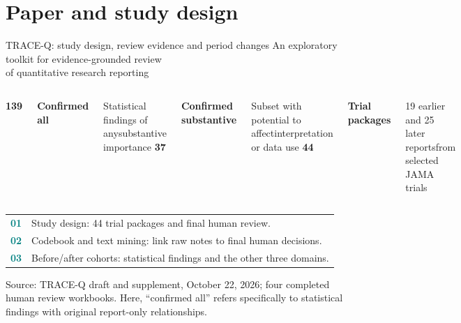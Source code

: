 \documentclass[10pt,aspectratio=169]{beamer}
\newcommand{\src}[1]{\par\vfill{\color{Slate}\fontsize{6.5}{8}\selectfont #1\par}}
\begin{document}
\section{Paper and study design}

\begin{frame}[t]{TRACE-Q: study design, review evidence and period changes}
\vspace{1mm}
{\large An exploratory toolkit for evidence-grounded review\\of quantitative research reporting}\par
\vspace{4mm}
\begin{columns}[T,onlytextwidth]
{\color{Blue}\fontsize{30}{32}\selectfont\bfseries 139}\par
\textbf{Confirmed all}\par
\small Statistical findings of any\newline substantive importance
{\color{Teal}\fontsize{30}{32}\selectfont\bfseries 37}\par
\textbf{Confirmed substantive}\par
\small Subset with potential to affect\newline interpretation or data use
{\color{Navy}\fontsize{30}{32}\selectfont\bfseries 44}\par
\textbf{Trial packages}\par
\small 19 earlier and 25 later reports\newline from selected JAMA trials
\end{columns}
\vspace{5mm}
\begin{tabularx}{\linewidth}{@{}rY@{}}
\textcolor{Teal}{\textbf{01}} & Study design: 44 trial packages and final human review.\\
\textcolor{Teal}{\textbf{02}} & Codebook and text mining: link raw notes to final human decisions.\\
\textcolor{Teal}{\textbf{03}} & Before/after cohorts: statistical findings and the other three domains.
\end{tabularx}
\src{Source: TRACE-Q draft and supplement, October 22, 2026; four completed human review workbooks. Here, ``confirmed all'' refers specifically to statistical findings with original report-only relationships.}
\end{frame}
\end{document}
